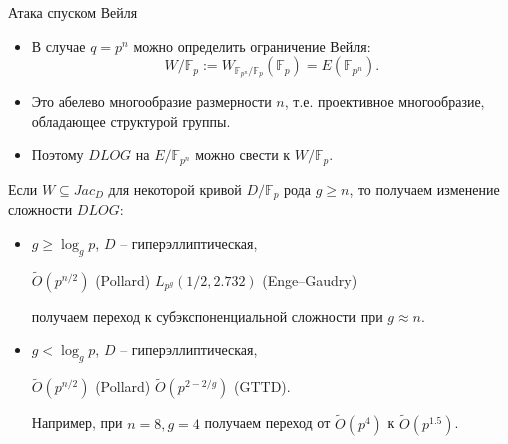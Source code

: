 \documentclass{beamer}
\begin{document}
\begin{frame}{Атака спуском Вейля}
    \begin{itemize}
        \item В случае $q = p^n$ можно определить ограничение Вейля:
        \[
        W/\mathbb{F}_p := W_{\mathbb{F}_{p^n} / \mathbb{F}_p}(\mathbb{F}_p) = E(\mathbb{F}_{p^n}).
        \]
        \item Это абелево многообразие размерности $n$, т.е. проективное многообразие, обладающее структурой группы.
        \item Поэтому $DLOG$ на $E/\mathbb{F}_{p^n}$ можно свести к $W/\mathbb{F}_p$.
    \end{itemize}
\end{frame}

\begin{frame}
Если $W \subseteq Jac_D$ для некоторой кривой $D/\mathbb{F}_p$ рода $g \geq n$, то получаем изменение сложности $DLOG$:
\begin{itemize}
    \item $g \geq \log_g{p}$, $D$ -- гиперэллиптическая,%
    \begin{center}
      $\widetilde{O}(p^{n/2})$ (Pollard) \structure{$\implies$} $L_{p^g}(1/2, 2.732)$ (Enge–Gaudry)
    \end{center}
    получаем переход к субэкспоненциальной сложности при $g \approx n$.
    \item $g < \log_g{p}$, $D$ -- гиперэллиптическая,
    \begin{center}
        $\widetilde{O}(p^{n/2})$ (Pollard) \structure{$\implies$} $\widetilde{O}(p^{2-2/g})$ (GTTD).
    \end{center}
    Например, при $n = 8, g = 4$ получаем переход от $\widetilde{O}(p^{4})$ к $\widetilde{O}(p^{1.5})$.
\end{itemize}
\end{frame}
\end{document}

